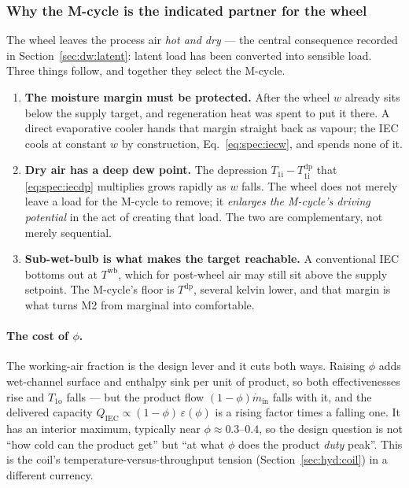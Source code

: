 \documentclass[11pt]{article}
\newcommand{\md}{\ensuremath{\dot m}}
\begin{document}
\subsubsection{Why the M-cycle is the indicated partner for the wheel}
The wheel leaves the process air \emph{hot and dry} --- the central consequence recorded in
Section~\ref{sec:dw:latent}: latent load has been converted into sensible load. Three things follow,
and together they select the M-cycle.
\begin{enumerate}[nosep]
\item \textbf{The moisture margin must be protected.} After the wheel $w$ already sits below the
supply target, and regeneration heat was spent to put it there. A direct evaporative cooler hands
that margin straight back as vapour; the IEC cools at constant $w$ by construction,
Eq.~\eqref{eq:spec:iecw}, and spends none of it.
\item \textbf{Dry air has a deep dew point.} The depression $T_{\mathrm{1i}}-T_{\mathrm{1i}}^{
\mathrm{dp}}$ that \eqref{eq:spec:iecdp} multiplies grows rapidly as $w$ falls. The wheel does not
merely leave a load for the M-cycle to remove; it \emph{enlarges the M-cycle's driving potential} in
the act of creating that load. The two are complementary, not merely sequential.
\item \textbf{Sub-wet-bulb is what makes the target reachable.} A conventional IEC bottoms out at
$T^{\mathrm{wb}}$, which for post-wheel air may still sit above the supply setpoint. The M-cycle's
floor is $T^{\mathrm{dp}}$, several kelvin lower, and that margin is what turns M2 from marginal into
comfortable.
\end{enumerate}

\paragraph{The cost of $\phi$.} The working-air fraction is the design lever and it cuts both ways.
Raising $\phi$ adds wet-channel surface and enthalpy sink per unit of product, so both effectivenesses
rise and $T_{\mathrm{1o}}$ falls --- but the product flow $(1-\phi)\md_{\mathrm{in}}$ falls with it,
and the delivered capacity $Q_{\mathrm{IEC}}\propto(1-\phi)\,\varepsilon(\phi)$ is a rising factor
times a falling one. It has an interior maximum, typically near $\phi\approx\numrange{0.3}{0.4}$,
so the design question is not ``how cold can the product get'' but ``at what $\phi$ does the
product \emph{duty} peak''. This is the coil's temperature-versus-throughput tension
(Section~\ref{sec:hyd:coil}) in a different currency.
\end{document}
